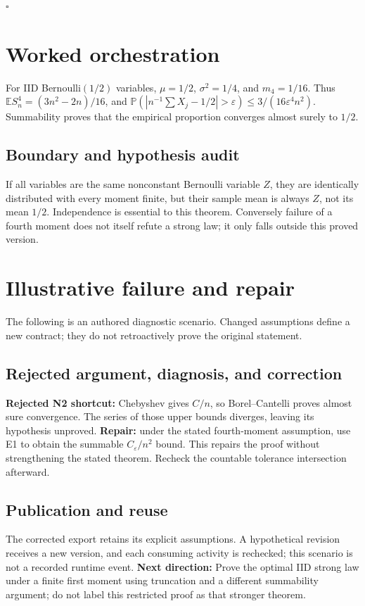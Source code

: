 \documentclass[preprint,12pt,aps,pra,showkeys,amsmath,amssymb,superscriptaddress,floatfix]{revtex4-2}
\theoremstyle{definition}
\theoremstyle{remark}
\begin{document}
\hfill$\square$

\section{Worked orchestration}

For IID Bernoulli\((1/2)\) variables, \(\mu=1/2\), \(\sigma^2=1/4\), and
\(m_4=1/16\). Thus \(\mathbb ES_n^4=(3n^2-2n)/16\), and
\(\mathbb P(|n^{-1}\sum X_j-1/2|>\varepsilon)\le3/(16\varepsilon^4n^2)\).
Summability proves that the empirical proportion converges almost surely
to \(1/2\).

\subsection{Boundary and hypothesis audit}

If all variables are the same nonconstant Bernoulli variable \(Z\), they
are identically distributed with every moment finite, but their sample
mean is always \(Z\), not its mean \(1/2\). Independence is essential to
this theorem. Conversely failure of a fourth moment does not itself
refute a strong law; it only falls outside this proved version.

\section{Illustrative failure and repair}

The following is an authored diagnostic scenario. Changed assumptions
define a new contract; they do not retroactively prove the original
statement.

\subsection{Rejected argument, diagnosis, and correction}
\textbf{Rejected N2 shortcut:} Chebyshev gives \(C/n\), so
Borel--Cantelli proves almost sure convergence. The series of those
upper bounds diverges, leaving its hypothesis unproved. \textbf{Repair:}
under the stated fourth-moment assumption, use E1 to obtain the summable
\(C_\varepsilon/n^2\) bound. This repairs the proof without
strengthening the stated theorem. Recheck the countable tolerance
intersection afterward.

\subsection{Publication and reuse}
The corrected export retains its explicit assumptions. A hypothetical
revision receives a new version, and each consuming activity is
rechecked; this scenario is not a recorded runtime event. \textbf{Next
direction:} Prove the optimal IID strong law under a finite first moment
using truncation and a different summability argument; do not label this
restricted proof as that stronger theorem.
\end{document}
